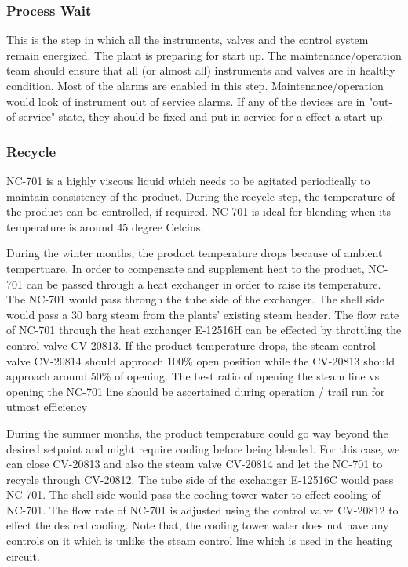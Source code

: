 \documentclass[a4paper,oneside]{article}
\begin{document}
\subsubsection*{Process Wait}
\label{sec:org2d6abe9}
This is the step in which all the instruments, valves and the control
system remain energized. The plant is preparing for start up. The
maintenance/operation team should ensure that all (or almost all)
instruments and valves are in healthy condition. Most of the alarms
are enabled in this step. Maintenance/operation would look of
instrument out of service alarms. If any of the devices are in
"out-of-service" state, they should be fixed and put in service for a
effect a start up.
\subsubsection*{Recycle}
\label{sec:orgebf159c}
NC-701 is a highly viscous liquid which needs to be agitated
periodically to maintain consistency of the product. During the
recycle step, the temperature of the product can be controlled, if
required. NC-701 is ideal for blending when its temperature is around
45 degree Celcius. 

During the winter months, the product temperature drops because of
ambient tempertuare. In order to compensate and supplement heat to the
product, NC-701 can be passed through a heat exchanger in order to
raise its temperature. The NC-701 would pass through the tube side of
the exchanger. The shell side would pass a 30 barg steam from the
plants' existing steam header. The flow rate of NC-701 through the
heat exchanger E-12516H can be effected by throttling the control
valve CV-20813. If the product temperature drops, the steam control
valve CV-20814 should approach 100\% open position while the CV-20813
should approach around 50\% of opening. The best ratio of opening the
steam line vs opening the NC-701 line should be ascertained during
operation / trail run for utmost efficiency

During the summer months, the product temperature could go way beyond
the desired setpoint and might require cooling before being
blended. For this case, we can close CV-20813 and also the steam valve
CV-20814 and let the NC-701 to recycle through CV-20812. The tube side
of the exchanger E-12516C would pass NC-701. The shell side would pass
the cooling tower water to effect cooling of NC-701. The flow rate of
NC-701 is adjusted using the control valve CV-20812 to effect the
desired cooling. Note that, the cooling tower water does not have any
controls on it which is unlike the steam control line which is used in
the heating circuit.
\end{document}
